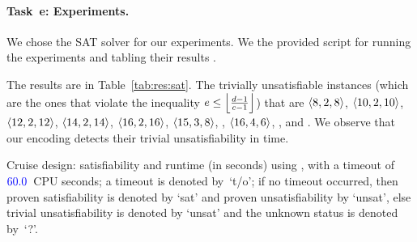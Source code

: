 \paragraph{Task~e: Experiments.}
We chose the SAT solver \SolverSAT for our experiments.
%
We  the provided script for running the
experiments and tabling their results
.

The results are in Table~\ref{tab:res:sat}.
%
The trivially unsatisfiable instances (which are the ones that violate
the inequality $e \leq \left\lfloor\frac{d-1}{c-1}\right\rfloor$) that  are
$\langle8,2,8\rangle$, $\langle10,2,10\rangle$, $\langle12,2,12\rangle$,
$\langle14,2,14\rangle$, $\langle16,2,16\rangle$, $\langle15,3,8\rangle$,
\todo{\filler}, $\langle16,4,6\rangle$, \todo{\filler}, and \todo{\filler}.
%
We observe that our encoding detects their trivial unsatisfiability in
\todo{\filler} time.

\begin{table}[t]  %
  \centering
  
  \caption{Cruise design: satisfiability and runtime (in seconds)
    using \SolverSAT, with a timeout of ${\color{blue}60.0}$~CPU seconds; a
    timeout is denoted by~`t/o'; if no timeout occurred, then proven
    satisfiability is denoted by `sat' and proven unsatisfiability by
    `unsat', else trivial unsatisfiability is denoted by `unsat' and
    the unknown status is denoted by~`?'.}
  \label{tab:res:sat}
\end{table}

